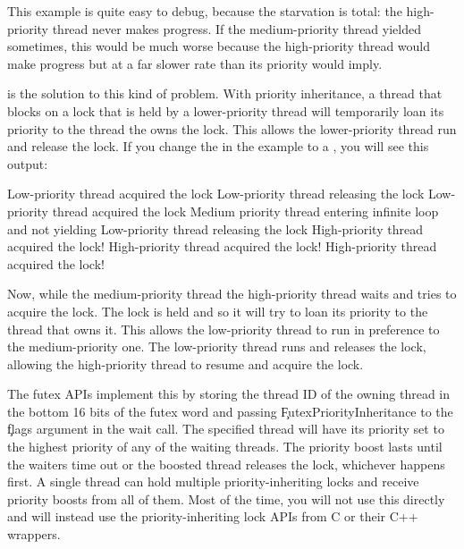 This example is quite easy to debug, because the starvation is total: the high-priority thread never makes progress.
If the medium-priority thread yielded sometimes, this would be much worse because the high-priority thread would make progress but at a far slower rate than its priority would imply.

 is the solution to this kind of problem.
With priority inheritance, a thread that blocks on a lock that is held by a lower-priority thread will temporarily loan its priority to the thread the owns the lock.
This allows the lower-priority thread run and release the lock.
If you change the  in the example to a , you will see this output:

\begin{console}
Low-priority thread acquired the lock
Low-priority thread releasing the lock
Low-priority thread acquired the lock
Medium priority thread entering infinite loop and not yielding
Low-priority thread releasing the lock
High-priority thread acquired the lock!
High-priority thread acquired the lock!
High-priority thread acquired the lock!
\end{console}

Now, while the medium-priority thread the high-priority thread waits and tries to acquire the lock.
The lock is held and so it will try to loan its priority to the thread that owns it.
This allows the low-priority thread to run in preference to the medium-priority one.
The low-priority thread runs and releases the lock, allowing the high-priority thread to resume and acquire the lock.

The futex APIs implement this by storing the thread ID of the owning thread in the bottom 16 bits of the futex word and passing \c{FutexPriorityInheritance} to the \c{flags} argument in the wait call.
The specified thread will have its priority set to the highest priority of any of the waiting threads.
The priority boost lasts until the waiters time out or the boosted thread releases the lock, whichever happens first.
A single thread can hold multiple priority-inheriting locks and receive priority boosts from all of them.
Most of the time, you will not use this directly and will instead use the priority-inheriting lock APIs from C or their C++ wrappers.

